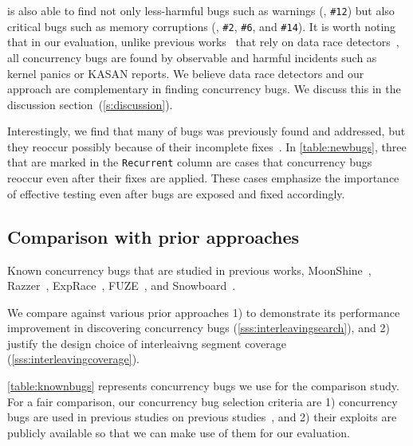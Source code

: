 \sys is also able to find not only less-harmful bugs such as warnings
(\eg, \texttt{\#12}) but also critical bugs such as memory corruptions
(\eg, \texttt{\#2}, \texttt{\#6}, and \texttt{\#14}).
%
It is worth noting that in our evaluation, unlike previous
works~\cite{snowboard, krace} that rely on data race
detectors~\cite{kcsan, tsan}, all concurrency bugs are found by
observable and harmful incidents such as kernel panics or KASAN
reports.
%
\dr{}
We believe data race detectors and our approach are complementary in
finding concurrency bugs. We discuss this in the discussion
section~(\autoref{s:discussion}).

Interestingly, we find that many of bugs was previously found and
addressed, but they reoccur possibly because of their incomplete
fixes~\cite{learningfrommistakes}.
%
In \autoref{table:newbugs}, three that are marked in the
\texttt{Recurrent} column are cases that concurrency bugs reoccur even
after their fixes are applied.
%
These cases emphasize the importance of effective testing even after
bugs are exposed and fixed accordingly.





\subsection{Comparison with prior approaches}
\label{ss:comparison}

\begin{table}[t]
  
  \centering
  \caption{Known concurrency bugs that are studied in previous works,
    MoonShine~\cite{moonshine}, Razzer~\cite{razzer},
    ExpRace~\cite{exprace}, FUZE~\cite{fuze}, and
    Snowboard~\cite{snowboard}.}
  \label{table:knownbugs}
\end{table}

We compare \sys against various prior approaches 1) to demonstrate its
performance improvement in discovering concurrency bugs
(\autoref{sss:interleavingsearch}), and 2) justify the design choice
of interleaivng segment coverage (\autoref{sss:interleavingcoverage}).



%
\autoref{table:knownbugs} represents concurrency bugs we use for the
comparison study.
%
For a fair comparison, our concurrency bug selection criteria are 1)
concurrency bugs are used in previous studies on previous
studies~\cite{exprace, razzer, snowboard, moonshine, fuze}, and 2)
their exploits are publicly available so that we can make use of them
for our evaluation.

